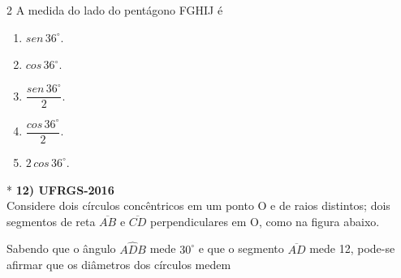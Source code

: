 \documentclass[11pt,a4paper]{article}
\begin{document}
\begin{paracol}{2}
    A medida do lado do pentágono FGHIJ é

    \begin{enumerate}[label=(\Alph*), itemsep=0.2cm]
        \item $sen\, 36^\circ$.
        \item $cos\, 36^\circ$.
        \item $\dfrac{sen\, 36^\circ}{2}$.
        \item $\dfrac{cos\, 36^\circ}{2}$.
        \item $2\, cos\, 36^\circ$.
    \end{enumerate}
    \vspace{0.4cm}

    \switchcolumn[1]
    \vspace{8.5cm}

    \switchcolumn[0]*
    \textbf{12) UFRGS-2016} \\
    Considere dois círculos concêntricos em um ponto O e de raios distintos; dois segmentos de reta $\overline{AB}$ e $\overline{CD}$ perpendiculares em O, como na figura abaixo.

    \vspace{0.3cm}
    \begin{center}
    \end{center}
    \vspace{0.3cm}

    Sabendo que o ângulo $A\hat{D}B$ mede $30^\circ$ e que o segmento $\overline{AD}$ mede 12, pode-se afirmar que os diâmetros dos círculos medem


\end{paracol}
\end{document}
